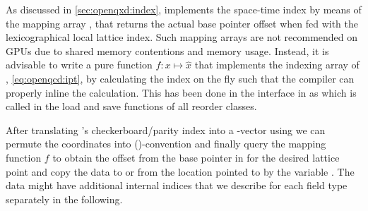 

As discussed in \cref{sec:openqxd:index}, \openqxd implements the space-time index by means of the mapping array , that returns the actual base pointer offset when fed with the lexicographical local lattice index.
Such mapping arrays are not recommended on GPUs due to shared memory contentions and memory usage. Instead, it is advisable to write a pure function $f \colon x \mapsto \hat{x}$ that implements the indexing array of \openqxd, \cref{eq:openqcd:ipt}, by calculating the index on the fly such that the compiler can properly inline the calculation. This has been done in the interface in as  which is called in the load and save functions of all reorder classes.




After translating \quda's checkerboard/parity index into a -vector using  we can permute the coordinates into (\txyz)-convention and finally query the mapping function $f$ to obtain the offset from the base pointer in \openqxd for the desired lattice point and copy the data to or from the location pointed to by the variable .
The data might have additional internal indices that we describe for each field type separately in the following.


